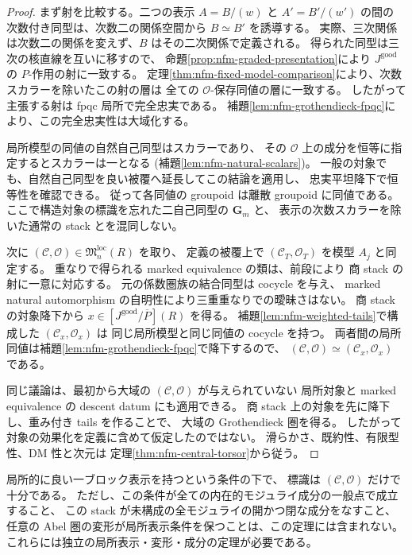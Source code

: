 \begin{proof}
まず射を比較する。二つの表示 $A=B/(w)$ と $A'=B'/(w')$ の間の
次数付き同型は、次数二の関係空間から $B\simeq B'$ を誘導する。
実際、三次関係は次数二の関係を変えず、$B$ はその二次関係で定義される。
得られた同型は三次の核直線を互いに移すので、
命題\ref{prop:nfm-graded-presentation}により $J^{\mathrm{good}}$ の $P$-作用の射に一致する。
定理\ref{thm:nfm-fixed-model-comparison}により、次数スカラーを除いたこの射の層は
全ての $\mathcal O$-保存同値の層に一致する。
したがって主張する射は fpqc 局所で完全忠実である。
補題\ref{lem:nfm-grothendieck-fpqc}により、この完全忠実性は大域化する。

局所模型の同値の自然自己同型はスカラーであり、
その $\mathcal O$ 上の成分を恒等に指定するとスカラーは一となる
\textup{(}補題\ref{lem:nfm-natural-scalars}\textup{)}。
一般の対象でも、自然自己同型を良い被覆へ延長してこの結論を適用し、
忠実平坦降下で恒等性を確認できる。
従って各同値の groupoid は離散 groupoid に同値である。
ここで構造対象の標識を忘れた二自己同型の $\mathbf G_m$ と、
表示の次数スカラーを除いた通常の stack とを混同しない。

次に $(\mathcal C,\mathcal O)\in\mathfrak M_n^{\mathrm{loc}}(R)$ を取り、
定義の被覆上で $(\mathcal C_T,\mathcal O_T)$ を模型 $A_j$ と同定する。
重なりで得られる marked equivalence の類は、前段により
商 stack の射に一意に対応する。
元の係数圏族の結合同型は cocycle を与え、
marked natural automorphism の自明性により三重重なりでの曖昧さはない。
商 stack の対象降下から $x\in[J^{\mathrm{good}}/\overline P](R)$ を得る。
補題\ref{lem:nfm-weighted-tails}で構成した $(\mathcal C_x,\mathcal O_x)$ は
同じ局所模型と同じ同値の cocycle を持つ。
両者間の局所同値は補題\ref{lem:nfm-grothendieck-fpqc}で降下するので、
$(\mathcal C,\mathcal O)\simeq(\mathcal C_x,\mathcal O_x)$ である。

同じ議論は、最初から大域の $(\mathcal C,\mathcal O)$ が与えられていない
局所対象と marked equivalence の descent datum にも適用できる。
商 stack 上の対象を先に降下し、重み付き tails を作ることで、
大域の Grothendieck 圏を得る。
したがって対象の効果化を定義に含めて仮定したのではない。
滑らかさ、既約性、有限型性、DM 性と次元は
定理\ref{thm:nfm-central-torsor}から従う。
\end{proof}

\begin{remark}[証明した範囲]
局所的に良い一ブロック表示を持つという条件の下で、
標識は $(\mathcal C,\mathcal O)$ だけで十分である。
ただし、この条件が全ての内在的モジュライ成分の一般点で成立すること、
この stack が未構成の全モジュライの開かつ閉な成分をなすこと、
任意の Abel 圏の変形が局所表示条件を保つことは、この定理には含まれない。
これらには独立の局所表示・変形・成分の定理が必要である。
\end{remark}

